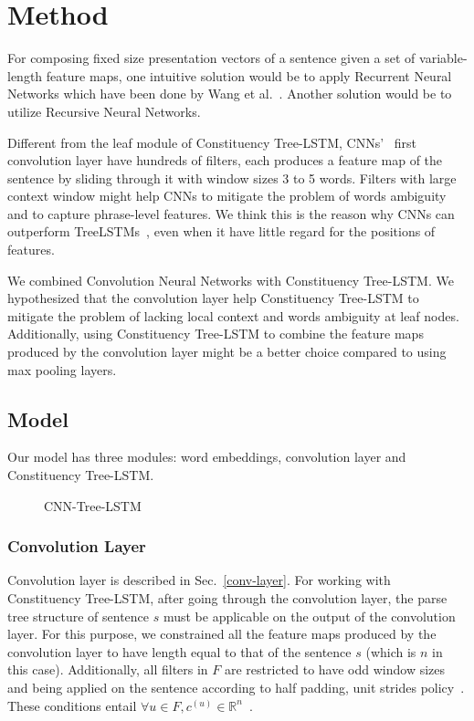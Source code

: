 \section{Method}\label{sec:cnn-treelstm}
For composing fixed size presentation vectors of a sentence given a set of variable-length feature maps, one intuitive solution would be to apply Recurrent Neural Networks which have been done by Wang et al.~\cite{cnn-rnn}.
Another solution would be to utilize Recursive Neural Networks.

Different from the leaf module of Constituency Tree-LSTM, CNNs'~\cite{KimCNN,DCNN,2-layer-cnn} first convolution layer have hundreds of filters, each produces a feature map of the sentence by sliding through it with window sizes 3 to 5 words.
Filters with large context window might help CNNs to mitigate the problem of words ambiguity and to capture phrase-level features.
We think this is the reason why CNNs can outperform TreeLSTMs~\cite{KimCNN}, even when it have little regard for the positions of features. 

We combined Convolution Neural Networks with Constituency Tree-LSTM.
We hypothesized that the convolution layer help Constituency Tree-LSTM to mitigate the problem of lacking local context and words ambiguity at leaf nodes.
Additionally, using Constituency Tree-LSTM to combine the feature maps produced by the convolution layer might be a better choice compared to using max pooling layers.
\subsection{Model}
Our model has three modules: word embeddings, convolution layer and Constituency Tree-LSTM.
\begin{figure} [H]
	\centering
	
	\caption[qwerty]{CNN-Tree-LSTM}
\end{figure}
\subsubsection{Convolution Layer}
Convolution layer is described in Sec.~\ref{conv-layer}.
For working with Constituency Tree-LSTM, after going through the convolution layer, the parse tree structure of sentence \(s\) must be applicable on the output of the convolution layer. 
For this purpose, we constrained all the feature maps produced by the convolution layer to have length equal to that of the sentence \(s\) (which is \(n\) in this case).
Additionally, all filters in \(F\) are restricted to have odd window sizes and being applied on the sentence according to half padding, unit strides policy~\cite{conv-arith}.
These conditions entail \({\forall u \in F,  c^{(u)} \in \mathbb{R}^n}\)~\cite{conv-arith}.


